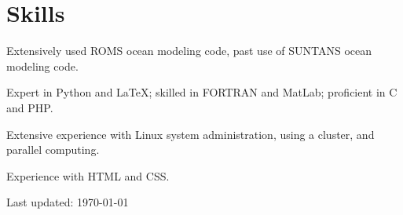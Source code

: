 \documentclass[10pt,letterpaper]{article}
\renewenvironment{itemize}{
  \begin{list}{}{
    \setlength{\leftmargin}{1.5em}
    \setlength{\itemsep}{0.25em}
    \setlength{\parskip}{0pt}
    \setlength{\parsep}{0.25em}
  }
}{
  \end{list}
}
\begin{document}
\section*{Skills}
\begin{itemize}
	\item Extensively used ROMS ocean modeling code, past use of SUNTANS ocean modeling code.
	\item Expert in Python and \LaTeX; skilled in FORTRAN and MatLab; proficient in C and PHP.
	\item Extensive experience with Linux system administration, using a cluster, and parallel computing.
	\item Experience with HTML and CSS.
\end{itemize}



\begin{center}
  \begin{small}
    Last updated: \today
  \end{small}
\end{center}
\end{document}
